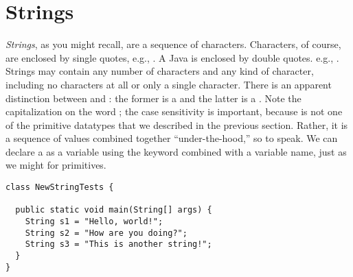 \section{Strings}

\emph{Strings}, as you might recall, are a sequence of characters. Characters, of course, are enclosed by single quotes, e.g., . A Java  is enclosed by double quotes. e.g., . Strings may contain any number of characters and any kind of character, including no characters at all or only a single character. There is an apparent distinction between  and : the former is a  and the latter is a . Note the capitalization on the word ; the case sensitivity is important, because  is not one of the primitive datatypes that we described in the previous section. Rather, it is a sequence of  values combined together ``under-the-hood,'' so to speak. We can declare a  as a variable using the keyword combined with a variable name, just as we might for primitives. 

\begin{lstlisting}[language=MyJava]
class NewStringTests {

  public static void main(String[] args) {
    String s1 = "Hello, world!";
    String s2 = "How are you doing?";
    String s3 = "This is another string!";
  }
}
\end{lstlisting}

